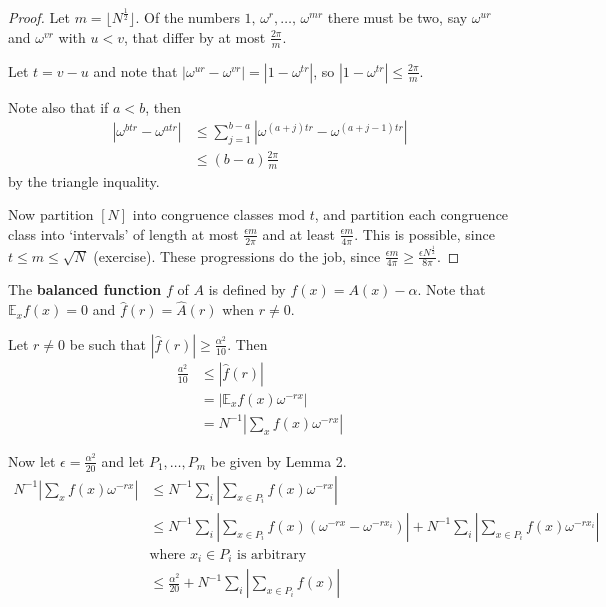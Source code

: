 \documentclass[a4paper]{article}
\newcommand*\abs[1]{\left|#1\right|}
\begin{document}
\begin{proof}
	Let $m=\lfloor N^{\frac{1}{2}}\rfloor$. Of the numbers $1,\, \omega^r,\dots,\, \omega ^{mr}$ there must be two, say $\omega^{ur}$ and $\omega^{vr}$ with $u<v$, that differ by at most $\frac{2\pi}{m}$.
	
	Let $t=v-u$ and note that $\abs{\omega^{ur}-\omega^{vr}} = \abs{1-\omega^{tr}}$, so $\abs{1-\omega^{tr}} \leq \frac{2\pi}{m}$.
	
	Note also that if $a < b$, then
	\begin{align*}
		\abs{\omega^{btr}-\omega^{atr}} & \leq \sum_{j=1}^{b-a}\abs{\omega^{(a+j)tr}-\omega^{(a+j-1)tr}}\\
		&\leq(b-a)\frac{2\pi}{m}
	\end{align*}
	by the triangle inquality.
	
	Now partition $[N]$ into congruence classes mod $t$, and partition each congruence class into `intervals' of length at most $\frac{\epsilon m}{2\pi}$ and at least $\frac{\epsilon m}{4\pi}$. This is possible, since $t \leq m \leq \sqrt{N}$ (exercise). These progressions do the job, since $\frac{\epsilon m}{4\pi} \geq \frac{\epsilon N^{\frac{1}{2}}}{8\pi}$.
\end{proof}

The \textbf{balanced function} $f$ of $A$ is defined by $f(x) = A(x) - \alpha$. Note that $\mathbb{E}_xf(x)=0$ and $\hat{f}(r)=\hat{A}(r)$ when $r \neq 0$.

Let $r \neq 0$ be such that $\abs{\hat{f}(r)} \geq \frac{\alpha^2}{10}$. Then
\begin{align*}
	\frac{a^2}{10} &\leq \abs{\hat{f}(r)} \\
	&= \abs{\mathbb{E}_xf(x)\omega^{-rx}} \\
	&= N^{-1}\abs{\sum_xf(x)\omega^{-rx}}
\end{align*}

Now let $\epsilon = \frac{\alpha^2}{20}$ and let $P_1, \dots, P_m$ be given by Lemma 2.
\begin{align*}
	N^{-1}\abs{\sum_xf(x)\omega^{-rx}} &\leq N^{-1}\sum_i\abs{\sum_{x \in P_i}f(x)\omega^{-rx}}\\
	&\leq N^{-1}\sum_i\abs{\sum_{x \in P_i} f(x)(\omega^{-rx}-\omega^{-rx_i})} + N^{-1}\sum_i\abs{\sum_{x \in P_i}f(x)\omega^{-rx_i}} \\
	&\text{where $x_i \in P_i$ is arbitrary}\\
	&\leq \frac{\alpha^2}{20} + N^{-1}\sum_i\abs{\sum_{x \in P_i} f(x)}
\end{align*}
\end{document}
